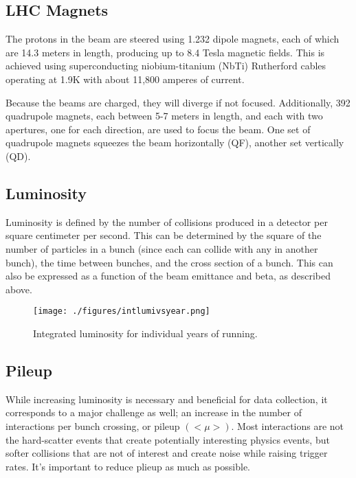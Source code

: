 \subsection{LHC Magnets}

The protons in the beam are steered using 1.232 dipole magnets, each of which are 14.3 meters in length, producing up to 8.4 Tesla magnetic fields.  This is achieved using superconducting niobium-titanium (NbTi) Rutherford cables operating at 1.9K with about 11,800 amperes of current.  

Because the beams are charged, they will diverge if not focused.  Additionally, 392 quadrupole magnets, each between 5-7 meters in length, and each with two apertures, one for each direction, are used to focus the beam.  One set of quadrupole magnets squeezes the beam horizontally (QF), another set vertically (QD). %

\subsection{Luminosity}

Luminosity is defined by the number of collisions produced in a detector per square centimeter per second.  This can be determined by the square of the number of particles in a bunch (since each can collide with any in another bunch), the time between bunches, and the cross section of a bunch.  This can also be expressed as a function of the beam emittance and beta, as described above.  

\begin{figure}[h!]
  \centering
	\texttt{[image: ./figures/intlumivsyear.png]}
\caption{\label{fig:intLum}{ Integrated luminosity for individual years of running. }} %
\end{figure}


\subsection{Pileup}

While increasing luminosity is necessary and beneficial for data collection, it corresponds to a major challenge as well; an increase in the number of interactions per bunch crossing, or pileup $(<\mu>)$.  Most interactions are not the hard-scatter events that create potentially interesting physics events, but softer collisions that are not of interest and create noise while raising trigger rates.  It's important to reduce plieup as much as possible.%

